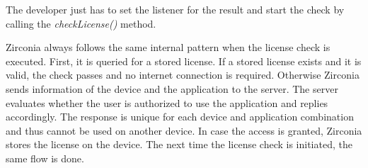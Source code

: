The developer just has to set the listener for the result and start the check by calling the \textit{checkLicense()} method.
\newline

Zirconia always follows the same internal pattern when the license check is executed.
First, it is queried for a stored license.
If a stored license exists and it is valid, the check passes and no internet connection is required.
Otherwise Zirconia sends information of the device and the application to the server.
The server evaluates whether the user is authorized to use the application and replies accordingly.
The response is unique for each device and application combination and thus cannot be used on another device.
In case the access is granted, Zirconia stores the license on the device.
The next time the license check is initiated, the same flow is done.
